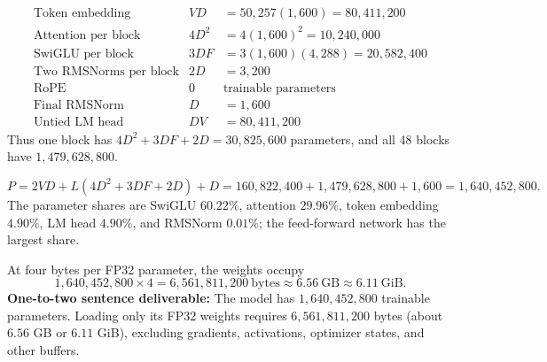 \documentclass[10pt,letterpaper]{article}
\begin{document}
\[
\begin{array}{lrl}
\text{Token embedding} & VD & =50{,}257(1{,}600)=80{,}411{,}200\\
\text{Attention per block} & 4D^2 & =4(1{,}600)^2=10{,}240{,}000\\
\text{SwiGLU per block} & 3DF & =3(1{,}600)(4{,}288)=20{,}582{,}400\\
\text{Two RMSNorms per block} & 2D & =3{,}200\\
\text{RoPE} & 0 & \text{trainable parameters}\\
\text{Final RMSNorm} & D & =1{,}600\\
\text{Untied LM head} & DV & =80{,}411{,}200
\end{array}
\]
Thus one block has $4D^2+3DF+2D=30{,}825{,}600$ parameters, and all 48 blocks have $1{,}479{,}628{,}800$.\par
\[
P=2VD+L(4D^2+3DF+2D)+D
=160{,}822{,}400+1{,}479{,}628{,}800+1{,}600
=\boxed{1{,}640{,}452{,}800}.
\]
The parameter shares are SwiGLU $60.22\%$, attention $29.96\%$, token embedding $4.90\%$, LM head $4.90\%$, and RMSNorm $0.01\%$; the feed-forward network has the largest share.\par
At four bytes per FP32 parameter, the weights occupy
\[
1{,}640{,}452{,}800\times4
=\boxed{6{,}561{,}811{,}200\ \mathrm{bytes}}
\approx\boxed{6.56\ \mathrm{GB}}
\approx 6.11\ \mathrm{GiB}.
\]
\textbf{One-to-two sentence deliverable:} The model has $1{,}640{,}452{,}800$ trainable parameters. Loading only its FP32 weights requires $6{,}561{,}811{,}200$ bytes (about $6.56$ GB or $6.11$ GiB), excluding gradients, activations, optimizer states, and other buffers.\par
\end{document}
